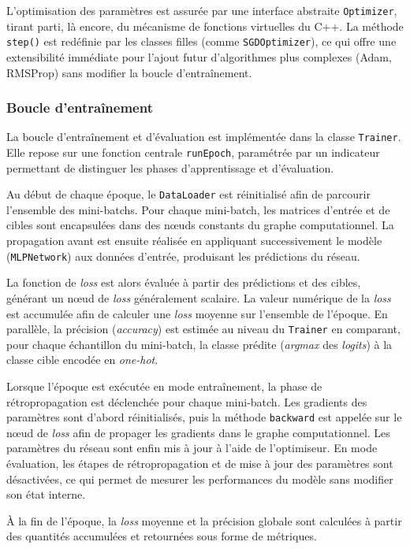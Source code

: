 \documentclass[a4paper,11pt]{article}
\begin{document}
L'optimisation des paramètres est assurée par une interface abstraite \texttt{Optimizer}, tirant parti, là encore, du mécanisme de fonctions virtuelles du C++. La méthode \texttt{step()} est redéfinie par les classes filles (comme \texttt{SGDOptimizer}), ce qui offre une extensibilité immédiate pour l'ajout futur d'algorithmes plus complexes (Adam, RMSProp) sans modifier la boucle d'entraînement.

\subsubsection{Boucle d'entraînement}
La boucle d'entraînement et d'évaluation est implémentée dans la classe \texttt{Trainer}. Elle repose sur une fonction centrale \texttt{runEpoch}, paramétrée par un indicateur permettant de distinguer les phases d'apprentissage et d'évaluation.

Au début de chaque époque, le \texttt{DataLoader} est réinitialisé afin de parcourir l'ensemble des mini-batchs. Pour chaque mini-batch, les matrices d'entrée et de cibles sont encapsulées dans des nœuds constants du graphe computationnel. La propagation avant est ensuite réalisée en appliquant successivement le modèle (\texttt{MLPNetwork}) aux données d'entrée, produisant les prédictions du réseau.

La fonction de \textit{loss} est alors évaluée à partir des prédictions et des cibles, générant un nœud de \textit{loss} généralement scalaire. La valeur numérique de la \textit{loss} est accumulée afin de calculer une \textit{loss} moyenne sur l'ensemble de l'époque. En parallèle, la précision (\textit{accuracy}) est estimée au niveau du \texttt{Trainer} en comparant, pour chaque échantillon du mini-batch, la classe prédite (\textit{argmax} des \textit{logits}) à la classe cible encodée en \textit{one-hot}.

Lorsque l'époque est exécutée en mode entraînement, la phase de rétropropagation est déclenchée pour chaque mini-batch. Les gradients des paramètres sont d'abord réinitialisés, puis la méthode \texttt{backward} est appelée sur le nœud de \textit{loss} afin de propager les gradients dans le graphe computationnel. Les paramètres du réseau sont enfin mis à jour à l'aide de l'optimiseur. En mode évaluation, les étapes de rétropropagation et de mise à jour des paramètres sont désactivées, ce qui permet de mesurer les performances du modèle sans modifier son état interne.

À la fin de l'époque, la \textit{loss} moyenne et la précision globale sont calculées à partir des quantités accumulées et retournées sous forme de métriques.
\end{document}
